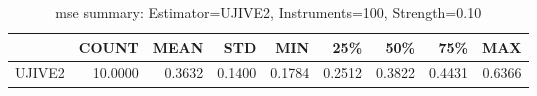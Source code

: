 \begin{table}[ht]
\centering
\caption{mse summary: Estimator=UJIVE2, Instruments=100, Strength=0.10}
\begin{tabular}{lrrrrrrrr}
\toprule
 & COUNT & MEAN & STD & MIN & 25\% & 50\% & 75\% & MAX \\
\midrule
UJIVE2 & 10.0000 & 0.3632 & 0.1400 & 0.1784 & 0.2512 & 0.3822 & 0.4431 & 0.6366 \\
\bottomrule
\end{tabular}
\end{table}

